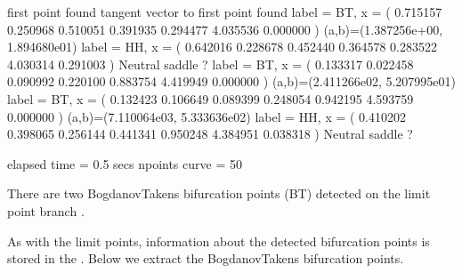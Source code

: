 \documentclass[letterpaper,10pt,english]{jupyterBook}
\begin{document}
\begin{sphinxVerbatim}[commandchars=\\\{\}]
\PYG{p}{[}\PYG{p}{]}
\end{sphinxVerbatim}

\begin{sphinxVerbatim}[commandchars=\\\{\}]
first point found
tangent vector to first point found
label = BT, x = ( \PYGZhy{}0.715157 \PYGZhy{}0.250968 0.510051 \PYGZhy{}0.391935 0.294477 4.035536 0.000000 )
(a,b)=(1.387256e+00, \PYGZhy{}1.894680e\PYGZhy{}01)
label = HH, x = ( \PYGZhy{}0.642016 \PYGZhy{}0.228678 0.452440 \PYGZhy{}0.364578 0.283522 4.030314 \PYGZhy{}0.291003 )
Neutral saddle ?
label = BT, x = ( \PYGZhy{}0.133317 0.022458 0.090992 \PYGZhy{}0.220100 0.883754 4.419949 0.000000 )
(a,b)=(\PYGZhy{}2.411266e\PYGZhy{}02, \PYGZhy{}5.207995e\PYGZhy{}01)
label = BT, x = ( \PYGZhy{}0.132423 0.106649 0.089399 \PYGZhy{}0.248054 0.942195 4.593759 \PYGZhy{}0.000000 )
(a,b)=(\PYGZhy{}7.110064e\PYGZhy{}03, 5.333636e\PYGZhy{}02)
label = HH, x = ( \PYGZhy{}0.410202 0.398065 0.256144 \PYGZhy{}0.441341 0.950248 4.384951 \PYGZhy{}0.038318 )
Neutral saddle ?

elapsed time  = 0.5 secs
npoints curve = 50
\end{sphinxVerbatim}

\sphinxAtStartPar
There are two Bogdanov\sphinxhyphen{}Takens bifurcation points (BT) detected on the limit
point branch .

\sphinxAtStartPar
As with the limit points, information about the detected bifurcation points is
stored in the  . Below we extract the
Bogdanov\sphinxhyphen{}Takens bifurcation points.
\end{document}
